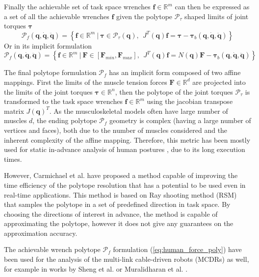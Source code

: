 Finally the achievable set of task space wrenches $\bm{f}\in\mathbb{R}^m$ can then be expressed as a set of all the achievable wrenches $\bm{f}$ given the polytope $\mathcal{P}_\tau$ shaped limits of joint torques $\bm{\tau}$
\begin{equation}
    \mathcal{P}_f(\bm{q},\dot{\bm{q}},\ddot{\bm{q}}) = \left\{ \bm{f} \in \mathbb{R}^m ~|~ \bm{\tau}\in \mathcal{P}_\tau(\bm{q}), ~~ J^T(\bm{q})\bm{f} = \bm{\tau} -\bm{\tau}_b(\bm{q},\dot{\bm{q}},\ddot{\bm{q}}) \right\}
    \label{eq:human_force_poly_ver_poly_lim}
\end{equation}
Or in its implicit formulation
\begin{equation}
    \mathcal{P}_f(\bm{q},\dot{\bm{q}},\ddot{\bm{q}}) = \left\{ \bm{f} \in \mathbb{R}^m ~|~ \bm{F}\in\left[\bm{F}_{min}, \bm{F}_{max} \right], ~~ \!J^T(\bm{q})\bm{f} =\! N(\bm{q})\bm{F} -\bm{\tau}_b(\bm{q},\dot{\bm{q}},\ddot{\bm{q}}) \right\}
    \label{eq:human_force_poly}
\end{equation}

The final polytope formulation $\mathcal{P}_f$ has an implicit form composed of two affine mappings. First the limits of the muscle tension forces $\bm{F}\in \mathbb{R}^d$ are projected into the limits of the joint torques $\bm{\tau}\in \mathbb{R}^n$, then the polytope of the joint torques $\mathcal{P}_\tau$ is transformed to the task space wrenches $\bm{f}\in \mathbb{R}^m$ using the jacobian transpose matrix $J(\bm{q})^T$. As the musculoskeletal models often have large number of muscles $d$, the ending polytope $\mathcal{P}_f$ geometry is complex (having a large number of vertices and faces), both due to the number of muscles considered and the inherent complexity of the affine mapping. Therefore, this metric has been mostly used for static in-advance analysis of human postures \cite{hernandez_toward_2015}, due to its long execution times. 

However, Carmichael et al. \cite{carmichael_estimating_2013, carmichael2011Towards} have proposed a method capable of improving the time efficiency of the polytope resolution that has a potential to be used even in real-time applications. This method is based on Ray shooting method (RSM) that samples the polytope in a set of predefined direction in task space. By choosing the directions of interest in advance, the method is capable of approximating the polytope, however it does not give any guarantees on the approximation accuracy.

The achievable wrench polytope $\mathcal{P}_f$ formulation (\ref{eq:human_force_poly}) have been used for the analysis of the multi-link cable-driven robots (MCDRs) as well, for example in works by Sheng et al. \cite{sheng2020operational} or Muralidharan et al. \cite{Muralidharan2022}.

